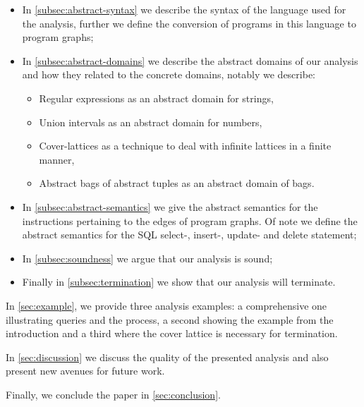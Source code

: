 \begin{itemize}
    \item In \autoref{subsec:abstract-syntax} we describe the syntax of the language used for the analysis, further we define the conversion of programs in this language to program graphs;
    \item In \autoref{subsec:abstract-domains} we describe the abstract domains of our analysis and how they related to the concrete domains, notably we describe:
    \begin{itemize}
        \item Regular expressions as an abstract domain for strings,
        \item Union intervals as an abstract domain for numbers,
        \item Cover-lattices as a technique to deal with infinite lattices in a finite manner,
        \item Abstract bags of abstract tuples as an abstract domain of bags.
    \end{itemize}
    \item In \autoref{subsec:abstract-semantics} we give the abstract semantics for the instructions pertaining to the edges of program graphs.
    Of note we define the abstract semantics for the SQL select-, insert-, update- and delete statement;
    \item In \autoref{subsec:soundness} we argue that our analysis is sound;
    \item Finally in \autoref{subsec:termination} we show that our analysis will terminate.
\end{itemize}

In \autoref{sec:example}, we provide three analysis examples: a comprehensive one illustrating queries and the process, a second showing the example from the introduction and a third where the cover lattice is necessary for termination.

In \autoref{sec:discussion} we discuss the quality of the presented analysis and also present new avenues for future work.

Finally, we conclude the paper in \autoref{sec:conclusion}.



